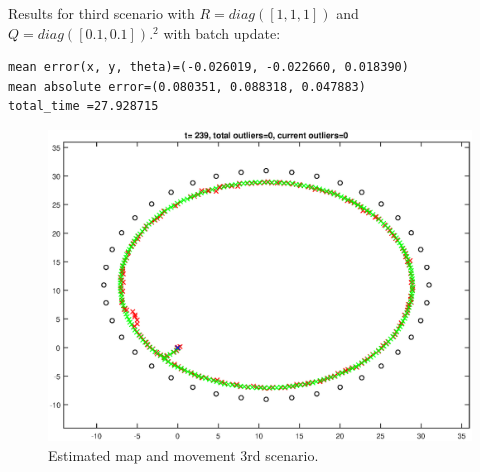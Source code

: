 \documentclass[12pt]{article}
\begin{document}
	Results for third scenario with \(R=diag([1,1,1])\) and \(Q=diag([0.1,0.1]).^2\) with batch update:
\begin{verbatim}
mean error(x, y, theta)=(-0.026019, -0.022660, 0.018390)
mean absolute error=(0.080351, 0.088318, 0.047883)
total_time =27.928715
\end{verbatim}
\begin{figure}[htbp]
 \centering
 \includegraphics[width=\textwidth]{test4_fig1}
 \caption{Estimated map and movement 3rd scenario.}
\end{figure}
\end{document}

